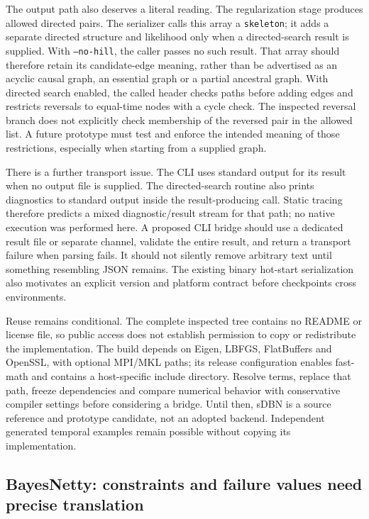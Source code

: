 The output path also deserves a literal reading. The regularization stage
produces allowed directed pairs. The serializer calls this array a
\texttt{skeleton}; it adds a separate directed structure and likelihood only
when a directed-search result is supplied. With \texttt{--no-hill}, the caller
passes no such result. That array should therefore retain its candidate-edge
meaning, rather than be advertised as an acyclic causal graph, an essential
graph or a partial ancestral graph. With directed search enabled, the called
header checks paths before adding edges and restricts reversals to equal-time
nodes with a cycle check. The inspected reversal branch does not explicitly
check membership of the reversed pair in the allowed list. A future prototype
must test and enforce the intended meaning of those restrictions, especially
when starting from a supplied graph. \citep{exec16_ct_sdbn}

There is a further transport issue. The CLI uses standard output for its result
when no output file is supplied. The directed-search routine also prints
diagnostics to standard output inside the result-producing call. Static tracing
therefore predicts a mixed diagnostic/result stream for that path; no native
execution was performed here. A proposed CLI bridge should use a dedicated
result file or separate channel, validate the entire result, and return a
transport failure when parsing fails. It should not silently remove arbitrary
text until something resembling JSON remains. The existing binary hot-start
serialization also motivates an explicit version and platform contract before
checkpoints cross environments. \citep{exec16_ct_sdbn,exec16_ct_design}

Reuse remains conditional. The complete inspected tree contains no README
or license file, so public access does not establish permission to copy or
redistribute the implementation. The build depends on Eigen, LBFGS,
FlatBuffers and OpenSSL, with optional MPI/MKL paths; its release configuration
enables fast-math and contains a host-specific include directory. Resolve
terms, replace that path, freeze dependencies and compare numerical behavior
with conservative compiler settings before considering a bridge. Until then,
sDBN is a source reference and prototype candidate, not an adopted backend.
Independent generated temporal examples remain possible without copying its
implementation. \citep{exec16_ct_sdbn}

\subsection{BayesNetty: constraints and failure values need precise translation}

